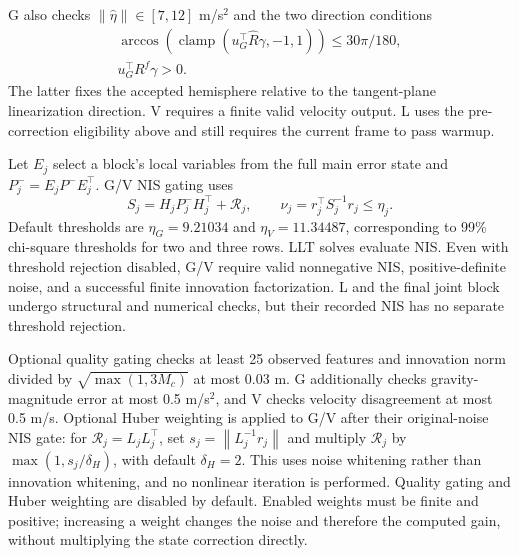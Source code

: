 \documentclass[a4paper,runningheads,twocolumn]{llncs}
\newcommand{\norm}[1]{\left\lVert #1\right\rVert}
\begin{document}
G also checks $\norm{\hat\eta}\in[7,12]$ m/s$^2$ and the two direction conditions
\begin{equation}
 \begin{gathered}
 \arccos\!\left(\operatorname{clamp}(u_G^\top\hat R\gamma,-1,1)\right)
      \leq30\pi/180,\\
 u_G^\top R^f\gamma>0.
 \end{gathered}
 \label{eq:gravitygate}
\end{equation}
The latter fixes the accepted hemisphere relative to the tangent-plane linearization direction. V requires a finite valid velocity output. L uses the pre-correction eligibility above and still requires the current frame to pass warmup.

Let $E_j$ select a block's local variables from the full main error state and $P_j^-=E_jP^-E_j^\top$. G/V NIS gating uses
\begin{equation}
 S_j=H_jP_j^-H_j^\top+\mathcal R_j,\qquad
 \nu_j=r_j^\top S_j^{-1}r_j\leq\eta_j.
 \label{eq:nis}
\end{equation}
Default thresholds are $\eta_G=9.21034$ and $\eta_V=11.34487$, corresponding to 99\% chi-square thresholds for two and three rows. LLT solves evaluate NIS. Even with threshold rejection disabled, G/V require valid nonnegative NIS, positive-definite noise, and a successful finite innovation factorization. L and the final joint block undergo structural and numerical checks, but their recorded NIS has no separate threshold rejection.

Optional quality gating checks at least 25 observed features and innovation norm divided by $\sqrt{\max(1,3M_c)}$ at most 0.03 m. G additionally checks gravity-magnitude error at most 0.5 m/s$^2$, and V checks velocity disagreement at most 0.5 m/s. Optional Huber weighting is applied to G/V after their original-noise NIS gate: for $\mathcal R_j=L_jL_j^\top$, set $s_j=\norm{L_j^{-1}r_j}$ and multiply $\mathcal R_j$ by $\max(1,s_j/\delta_H)$, with default $\delta_H=2$. This uses noise whitening rather than innovation whitening, and no nonlinear iteration is performed. Quality gating and Huber weighting are disabled by default. Enabled weights must be finite and positive; increasing a weight changes the noise and therefore the computed gain, without multiplying the state correction directly.
\end{document}
